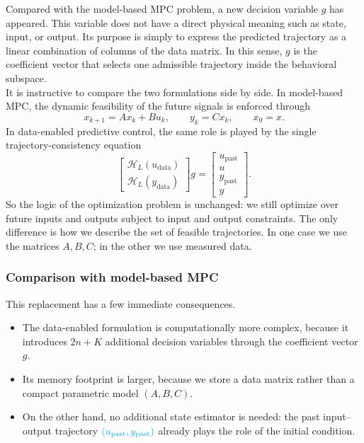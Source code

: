 Compared with the model-based MPC problem, a new decision variable \(g\) has appeared. This variable does not have a direct physical meaning such as state, input, or output. Its purpose is simply to express the predicted trajectory as a linear combination of columns of the data matrix. In this sense, \(g\) is the coefficient vector that selects one admissible trajectory inside the behavioral subspace.\\
It is instructive to compare the two formulations side by side. In model-based MPC, the dynamic feasibility of the future signals is enforced through
\[
x_{k+1}=Ax_k+Bu_k,\qquad y_k=Cx_k,\qquad x_0=x.
\]
In data-enabled predictive control, the same role is played by the single trajectory-consistency equation
\[
\begin{bmatrix}
\mathcal{H}_L(u_{\mathrm{data}})\\[1mm]
\mathcal{H}_L(y_{\mathrm{data}})
\end{bmatrix}g
=
\begin{bmatrix}
u_{\mathrm{past}}\\
u\\
y_{\mathrm{past}}\\
y
\end{bmatrix}.
\]
So the logic of the optimization problem is unchanged: we still optimize over future inputs and outputs subject to input and output constraints. The only difference is how we describe the set of feasible trajectories. In one case we use the matrices \(A,B,C\); in the other we use measured data.\\
\subsubsection{Comparison with model-based MPC}
This replacement has a few immediate consequences.

\begin{itemize}
    \item The data-enabled formulation is computationally more complex, because it introduces \(2n+K\) additional decision variables through the coefficient vector \(g\).
    \item Its memory footprint is larger, because we store a data matrix rather than a compact parametric model \((A,B,C)\).
    \item On the other hand, no additional state estimator is needed: the past input--output trajectory \(\textcolor{cyan}{(u_{\mathrm{past}},y_{\mathrm{past}})}\) already plays the role of the initial condition.
\end{itemize}

